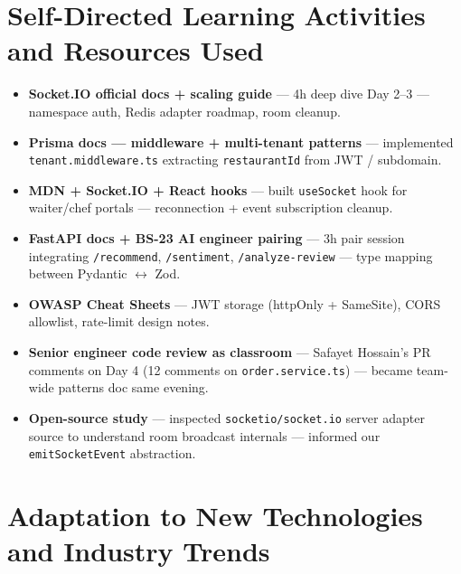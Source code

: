 \section{Self-Directed Learning Activities and Resources Used}

\begin{itemize}
\item \textbf{Socket.IO official docs + scaling guide} --- 4h deep dive Day 2--3 --- namespace auth, Redis adapter roadmap, room cleanup.
\item \textbf{Prisma docs --- middleware + multi-tenant patterns} --- implemented \texttt{tenant.middleware.ts} extracting \texttt{restaurantId} from JWT / subdomain.
\item \textbf{MDN + Socket.IO + React hooks} --- built \texttt{useSocket} hook for waiter/chef portals --- reconnection + event subscription cleanup.
\item \textbf{FastAPI docs + BS-23 AI engineer pairing} --- 3h pair session integrating \texttt{/recommend}, \texttt{/sentiment}, \texttt{/analyze-review} --- type mapping between Pydantic $\leftrightarrow$ Zod.
\item \textbf{OWASP Cheat Sheets} --- JWT storage (httpOnly + SameSite), CORS allowlist, rate-limit design notes.
\item \textbf{Senior engineer code review as classroom} --- Safayet Hossain's PR comments on Day 4 (12 comments on \texttt{order.service.ts}) --- became team-wide patterns doc same evening.
\item \textbf{Open-source study} --- inspected \texttt{socketio/socket.io} server adapter source to understand room broadcast internals --- informed our \texttt{emitSocketEvent} abstraction.
\end{itemize}

\section{Adaptation to New Technologies and Industry Trends}

